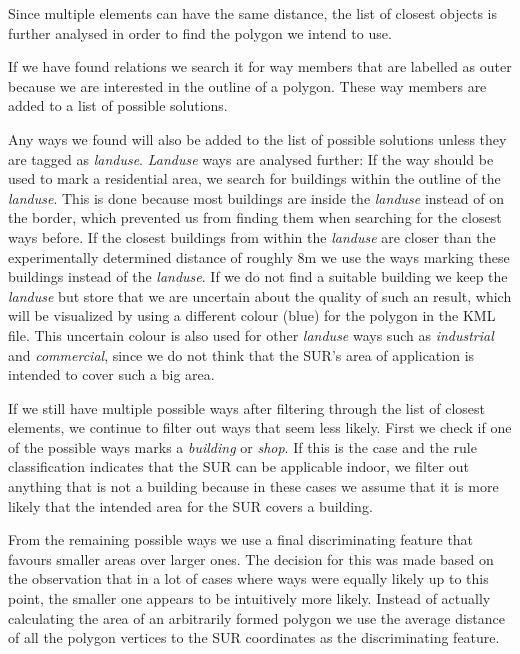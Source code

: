 \documentclass[11pt,fleqn]{book} %
\begin{document}
Since multiple elements can have the same distance, the list of closest objects is further analysed in order to find the polygon we intend to use. 

If we have found relations we search it for way members that are labelled as outer because we are interested in the outline of a polygon. These way members are added to a list of possible solutions.

Any ways we found will also be added to the list of possible solutions unless they are tagged as \textit{landuse}.
\textit{Landuse} ways are analysed further: If the way should be used to mark a residential area, we search for buildings within the outline of the \textit{landuse}. This is done because most buildings are inside the \textit{landuse} instead of on the border, which prevented us from finding them when searching for the closest ways before. If the closest buildings from within the \textit{landuse} are closer than the experimentally determined distance of roughly 8m we use the ways marking these buildings instead of the \textit{landuse}. If we do not find a suitable building we keep the \textit{landuse} but store that we are uncertain about the quality of such an result, which will be visualized by using a different colour (blue) for the polygon in the KML file. This uncertain colour is also used for other \textit{landuse} ways such as \textit{industrial} and \textit{commercial}, since we do not think that the SUR's area of application is intended to cover such a big area.

If we still have multiple possible ways after filtering through the list of closest elements, we continue to filter out ways that seem less likely. First we check if one of the possible ways marks a \textit{building} or \textit{shop}. If this is the case and the rule classification indicates that the SUR can be applicable indoor, we filter out anything that is not a building because in these cases we assume that it is more likely that the intended area for the SUR covers a building. 

From the remaining possible ways we use a final discriminating feature that favours smaller areas over larger ones. The decision for this was made based on the observation that in a lot of cases where ways were equally likely up to this point, the smaller one appears to be intuitively more likely. Instead of actually calculating the area of an arbitrarily formed polygon we use the average distance of all the polygon vertices to the SUR coordinates as the discriminating feature.
\end{document}
